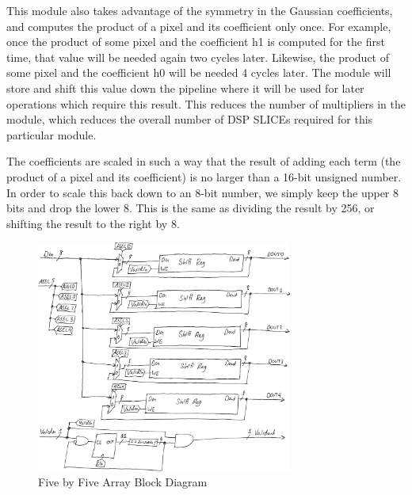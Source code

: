 This module also takes advantage of the symmetry in the Gaussian coefficients, 
and computes the product of a pixel and its coefficient only once. For example, 
once the product of some pixel and the coefficient h1 is computed for the first 
time, that value will be needed again two cycles later. Likewise, the product of 
some pixel and the coefficient h0 will be needed 4 cycles later. The module will 
store and shift this value down the pipeline where it will be used for later 
operations which require this result. This reduces the number of multipliers in 
the module, which reduces the overall number of DSP SLICEs required for this 
particular module.

The coefficients are scaled in such a way that the result of adding each term 
(the product of a pixel and its coefficient) is no larger than a 16-bit unsigned 
number. In order to scale this back down to an 8-bit number, we simply keep the 
upper 8 bits and drop the lower 8. This is the same as dividing the result by 
256, or shifting the result to the right by 8.

\begin{figure}
    \centering
    \includegraphics[width=0.75\textwidth]{processed_image_pngs/array.png}
    \caption{Five by Five Array Block Diagram}
    \label{fig:array}
\end{figure}


